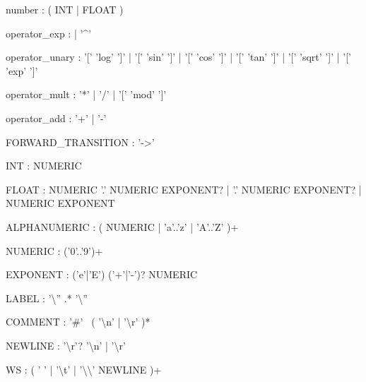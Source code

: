 \begin{bnfsource}
number :
  ( INT | FLOAT )
  

operator_exp :
  | '^'

operator_unary :
  '[' 'log' ']'
  | '[' 'sin' ']'
  | '[' 'cos' ']'
  | '[' 'tan' ']'
  | '[' 'sqrt' ']'
  | '[' 'exp' ']'

operator_mult :
  '*' | '/' | '[' 'mod' ']'

operator_add :
  '+' | '-'


FORWARD_TRANSITION :
  '->'

INT :
  NUMERIC

FLOAT :
  NUMERIC '.' NUMERIC EXPONENT?
  | '.' NUMERIC EXPONENT?
  | NUMERIC EXPONENT

ALPHANUMERIC :
  ( NUMERIC | 'a'..'z' | 'A'..'Z' )+

NUMERIC :
  ('0'..'9')+
  
EXPONENT :
  ('e'|'E') ('+'|'-')? NUMERIC

LABEL :
  '{\textbackslash}'' .* '{\textbackslash}''

COMMENT :
  '#' ~( '{\textbackslash}n' | '{\textbackslash}r' )*

NEWLINE :
  '{\textbackslash}r'? '{\textbackslash}n' | '{\textbackslash}r'

WS :
  ( ' ' | '{\textbackslash}t' | '{\textbackslash}{\textbackslash}' NEWLINE )+
\end{bnfsource}
